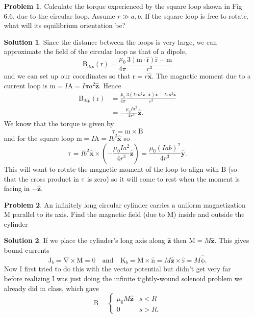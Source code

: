 \documentclass[10pt]{article}
\theoremstyle{definition}
\newtheorem{problem}{Problem}
\newtheorem{soln}{Solution}
\newcommand{\ux}{\hat{\mathbf{x}}}
\newcommand{\uy}{\hat{\mathbf{y}}}
\newcommand{\uz}{\hat{\mathbf{z}}}
\newcommand{\uv}[1]{\hat{\bv{{#1}}}}
\newcommand{\grd}{\nabla}
\newcommand{\bv}[1]{\bm{\mathrm{#1}}}
\begin{document}
\begin{problem}
Calculate the torque experienced by the square loop shown in Fig 6.6, due to the circular loop. Assume $r\gg a,b$. If the square loop is free to rotate,
what will its equilibrium orientation be?
\end{problem}
\begin{soln}
  Since the distance between the loops is very large, we can approximate the field of the circular loop as that of a dipole,
  $$\bv{B}_{dip}(\bv{r})=\frac{\mu_0}{4\pi}\frac{3\left(\bv{m}\cdot\uv{r}\right)\uv{r}-\bv{m}}{r^3}$$
  and we can set up our coordinates so that $\bv{r}=r\ux$. The magnetic moment due to a current loop is
  $\bv{m}=I\bv{A}=I\pi a^2\uz.$
  Hence
  \begin{align*}
    \bv{B}_{dip}(\bv{r}) & =\frac{\mu_0}{4\pi}\frac{3\left(I\pi a^2\uz\cdot \ux\right)\ux-I\pi a^2\uz}{r^3} \\
                         & =-\frac{\mu_0Ia^2}{4r^3}\uz.
  \end{align*}
  We know that the torque is given by
  $$\bv{\tau}=\bv{m}\times \bv{B}$$
  and for the square loop $\bv{m}=I\bv{A}=Ib^2\ux$ so
  $$\bv{\tau}=Ib^2\ux\times (-\frac{\mu_0Ia^2}{4r^3}\uz)=\frac{\mu_0(Iab)^2}{4r^3}\uy.$$
  This will want to rotate the magnetic moment of the loop to align with $\bv{B}$ (so that the cross product in $\bv{\tau}$ is zero) so it will come to rest when the moment is facing in $-\uz$.
\end{soln}

\begin{problem}
An infinitely long circular cylinder carries a uniform magnetization $\bv{M}$ parallel to its axis.
Find the magnetic field (due to $\bv{M}$) inside and outside the cylinder
\end{problem}
\begin{soln}
  If we place the cylinder's long axis along $\uz$ then $\bv{M}=M\uz$. This gives bound currents
  $$\bv{J}_b=\bv{\grd}\times \bv{M}=0\quad\text{and}\quad \bv{K}_b=\bv{M}\times\uv{n}=M\uz\times \uv{s}=M\uv{\phi}.$$
  Now I first tried to do this with the vector potential but didn't get very far before realizing I was just doing the infinite tightly-wound solenoid problem
  we already did in class, which gave
  $$
    \bv{B}=\begin{cases}
      \mu_0M\uz & s<R  \\
      0         & s>R.
    \end{cases}
  $$
\end{soln}
\end{document}
